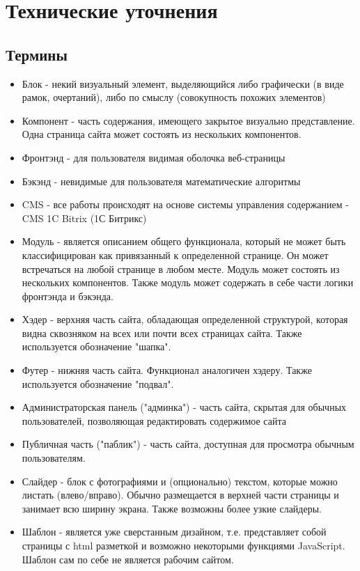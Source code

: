\documentclass[DIV=calc, paper=a4, fontsize=11pt]{scrartcl} %
\begin{document}
\section{Технические уточнения}

\subsection{Термины}

        \begin{itemize}
        \item Блок - некий визуальный элемент, выделяющийся либо графически (в виде рамок, очертаний), либо по смыслу (совокупность похожих элементов)
        \item Компонент - часть содержания, имеющего закрытое визуально представление. Одна страница сайта может состоять из нескольких компонентов.
        \item Фронтэнд - для пользователя видимая оболочка веб-страницы
        \item Бэкэнд - невидимые для пользователя математические алгоритмы
        \item CMS - все работы происходят на основе системы управления содержанием - CMS 1C Bitrix (1С Битрикс)
        \item Модуль - является описанием общего функционала, который не может быть классифицирован как привязанный к определенной странице. Он может встречаться на любой странице в любом месте. Модуль может состоять из нескольких компонентов. Также модуль может содержать в себе части логики фронтэнда и бэкэнда.
        \item Хэдер - верхняя часть сайта, обладающая определенной структурой, которая видна сквозняком на всех или почти всех страницах сайта. Также используется обозначение "шапка".
        \item Футер - нижняя часть сайта. Функционал аналогичен хэдеру. Также используется обозначение "подвал".
        \item Администраторская панель ("админка") - часть сайта, скрытая для обычных пользователей, позволяющая редактировать содержимое сайта
        \item Публичная часть ("паблик") - часть сайта, доступная для просмотра обычным пользователям.
        \item Слайдер - блок с фотографиями и (опционально) текстом, которые можно листать (влево/вправо). Обычно размещается в верхней части страницы и занимает всю ширину экрана. Также возможны более узкие слайдеры.
        \item Шаблон - является уже сверстанным дизайном, т.е. представляет собой страницы с html разметкой и возможно некоторыми функциями JavaScript. Шаблон сам по себе не является рабочим сайтом. 

    \end{itemize}
    
\end{document}
